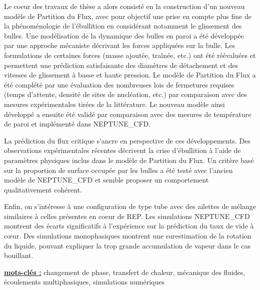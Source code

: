 \npar

Le coeur des travaux de thèse a alors consisté en la construction d’un nouveau modèle de Partition du Flux, avec pour objectif une prise en compte plus fine de la phénoménologie de l’ébullition en considérant notamment le glissement des bulles. Une modélisation de la dynamique des bulles en paroi a été développée par une approche mécaniste décrivant les forces appliquées sur la bulle. Les formulations de certaines forces (masse ajoutée, traînée, etc.) ont été réévaluées et permettent une prédiction satisfaisante des diamètres de détachement et des vitesses de glissement à basse et haute pression. Le modèle de Partition du Flux a été complété par une évaluation des nombreuses lois de fermetures requises (temps d’attente, densité de sites de nucléation, etc.) par comparaison avec des mesures expérimentales tirées de la littérature. Le nouveau modèle ainsi développé a ensuite été validé par comparaison avec des mesures de température de paroi et implémenté dans NEPTUNE\_CFD.

\npar

La prédiction du flux critique s’ancre en perspective de ces développements. Des observations expérimentales récentes décrivent la crise d’ébullition à l’aide de paramètres physiques inclus dans le modèle de Partition du Flux. Un critère basé sur la proportion de surface occupée par les bulles a été testé avec l’ancien modèle de NEPTUNE\_CFD et semble proposer un comportement qualitativement cohérent.

\npar

Enfin, on s’intéresse à une configuration de type tube avec des ailettes de mélange similaires à celles présentes en coeur de REP. Les simulations NEPTUNE\_CFD montrent des écarts significatifs à l’expérience sur la prédiction du taux de vide à cœur. Des simulations monophasiques montrent une surestimation de la rotation du liquide, pouvant expliquer la trop grande accumulation de vapeur dans le cas bouillant.
\endgroup			

\npar

\npar


\textbf{\underline{mots-clés :}} changement de phase, transfert de chaleur, mécanique des fluides, écoulements multiphasiques, simulations numériques
\vfill